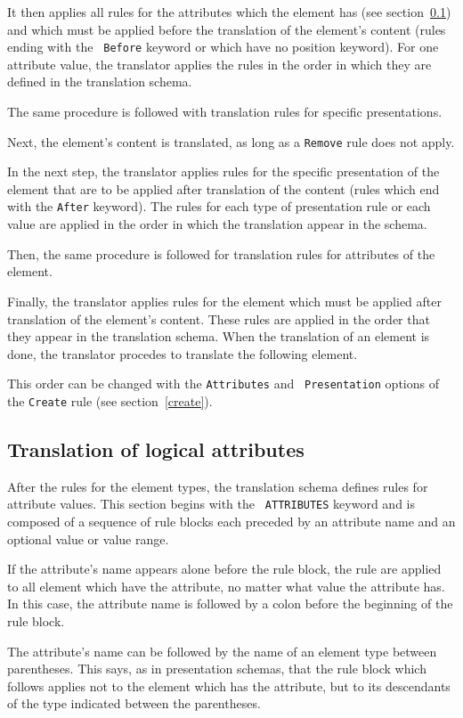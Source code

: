 It then applies all rules for the attributes which the element has
(see section~\ref{tradattr}) and which must be applied before the
translation of the element's content (rules ending with the {\tt
Before} keyword or which have no position keyword).  For one attribute
value, the translator applies the rules in the order in which they are
defined in the translation schema.

The same procedure is followed with translation rules for specific
presentations.

Next, the element's content is translated, as long as a {\tt Remove}
rule does not apply.

In the next step, the translator applies rules for the specific
presentation of the element that are to be applied after translation
of the content (rules which end with the {\tt After} keyword).  The
rules for each type of presentation rule or each value are applied in
the order in which the translation appear in the schema.

Then, the same procedure is followed for translation rules for
attributes of the element.

Finally, the translator applies rules for the element which must be
applied after translation of the element's content.  These rules are
applied in the order that they appear in the translation schema.  When
the translation of an element is done, the translator procedes to
translate the following element.

This order can be changed with the {\tt Attributes} and {\tt
Presentation} options of the {\tt Create} rule (see
section~\ref{create}).

\subsection{Translation of logical attributes}
\label{tradattr}

After the rules for the element types, the translation schema defines
rules for attribute values.  This section begins with the {\tt
ATTRIBUTES} keyword and is composed of a sequence of rule blocks each
preceded by an attribute name and an optional value or value range.

If the attribute's name appears alone before the rule block, the rule
are applied to all element which have the attribute, no matter what
value the attribute has.  In this case, the attribute name is followed
by a colon before the beginning of the rule block.

The attribute's name can be followed by the name of an element type
between parentheses.  This says, as in presentation schemas, that the
rule block which follows applies not to the element which has the
attribute, but to its descendants of the type indicated between the
parentheses.

